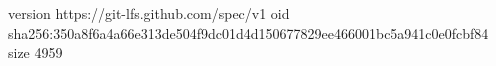 version https://git-lfs.github.com/spec/v1
oid sha256:350a8f6a4a66e313de504f9dc01d4d150677829ee466001bc5a941c0e0fcbf84
size 4959
